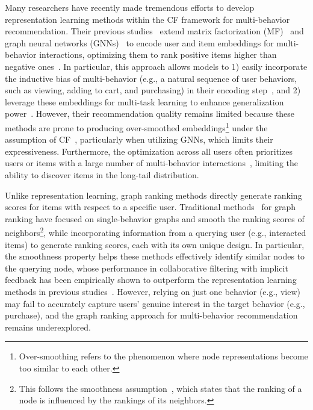 Many researchers have recently made tremendous efforts to develop representation learning methods within the CF framework for multi-behavior recommendation.
Their previous studies~\cite{LeeLKSJ24xxaw, ChengCHLZGP23fqvn, MengZGGLZZTLZ23, YanYCSSP23, MengMZYZL23} extend matrix factorization (MF)~\cite{KorenBV09} and graph neural networks (GNNs)~\cite{WangWHWFC19,HeHDWLZW20} to encode user and item embeddings for multi-behavior interactions, optimizing them to rank positive items higher than negative ones~\cite{RendleRFGS12}.
In particular, this approach allows models to 1) easily incorporate the inductive bias of multi-behavior (e.g., a natural sequence of user behaviors, such as viewing, adding to cart, and purchasing) in their encoding step~\cite{ChengCHLZGP23fqvn, MengMZYZL23, LiuXWY00024}, and 2) leverage these embeddings for multi-task learning to enhance generalization power~\cite{MengZGGLZZTLZ23,ZhangBCSYGWHH24,GaoGHGCFLCJ19}.
However, their recommendation quality remains limited because these methods are prone to producing over-smoothed embeddings\footnote{Over-smoothing refers to the phenomenon where node representations become too similar to each other.} under the assumption of CF~\cite{LiuGJ20,XiaHSX23,LiLCYLLD24}, particularly when utilizing GNNs, which limits their expressiveness.
Furthermore, the optimization across all users often prioritizes  users or items with a large number of multi-behavior interactions~\cite{YinCLYC12,abs-2410-04830}, limiting the ability to discover items in the long-tail distribution.


Unlike representation learning, graph ranking methods directly generate ranking scores for items with respect to a specific user.
Traditional methods~\cite{PanPYFD04,BrinB98,DengDLK09kqpg,HeHGKW17} for graph ranking have focused on single-behavior graphs and smooth the ranking scores of neighbors\footnote{This follows the smoothness assumption~\cite{ZhouZBLWS03,AgarwalA06}, which states that the ranking of a node is influenced by the rankings of its neighbors.}, while incorporating information from a querying user (e.g., interacted items) to generate ranking scores, each with its own unique design.
In particular, the smoothness property helps these methods effectively identify similar nodes to the querying node, whose performance in collaborative filtering with implicit feedback has been empirically shown to outperform the representation learning methods in previous studies~\cite{ParkPJK17,HeHGKW17,GoriGP07,LeeSKLL11}.
However, relying on just one behavior (e.g., view) may fail to accurately capture users’ genuine interest in the target behavior (e.g., purchase), and the graph ranking approach for multi-behavior recommendation remains underexplored.

